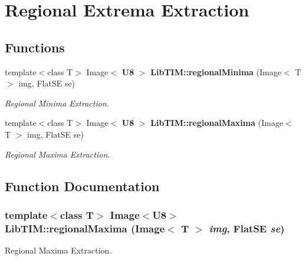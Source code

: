 \section{Regional Extrema Extraction}
\label{group__extremaExtraction}
\subsection*{Functions}
\begin{CompactItemize}
\item 
template$<$class T$>$ Image$<$ {\bf U8} $>$ {\bf Lib\-TIM::regional\-Minima} (Image$<$ T $>$ img, Flat\-SE se)
\begin{CompactList}\small\item\em Regional Minima Extraction. \item\end{CompactList}\item 
template$<$class T$>$ Image$<$ {\bf U8} $>$ {\bf Lib\-TIM::regional\-Maxima} (Image$<$ T $>$ img, Flat\-SE se)
\begin{CompactList}\small\item\em Regional Maxima Extraction. \item\end{CompactList}\end{CompactItemize}


\subsection{Function Documentation}
\subsubsection{\setlength{\rightskip}{0pt plus 5cm}template$<$class T$>$ Image$<${\bf U8}$>$ Lib\-TIM::regional\-Maxima (Image$<$ T $>$ {\em img}, Flat\-SE {\em se})}\label{group__extremaExtraction_ga1}


Regional Maxima Extraction. 

